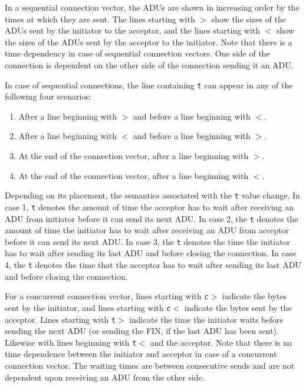 In a sequential connection vector, the ADUs are shown in increasing
order by the times at which they are sent.  The lines starting with
\texttt{$>$} show the sizes of the ADUs sent by the initiator
to the acceptor, and the lines starting with \texttt{$<$} show the
sizes of the ADUs sent by the acceptor to the initiator. Note
that there is a time dependency in case of sequential connection
vectors.  One side of the connection is dependent on the other side of
the connection sending it an ADU.

In case of sequential connections, the line containing
\texttt{t} can appear in any of the following four scenarios:
\begin{enumerate}
\item{After a line beginning with \texttt{$>$} and before a line
beginning with \texttt{$<$}}.
\item{After a line beginning with \texttt{$<$} and before a line
beginning with \texttt{$>$}}.
\item{At the end of the connection vector, after a line beginning with
\texttt{$>$}}.
\item{At the end of the connection vector, after a line beginning with
\texttt{$<$}}.
\end{enumerate}
Depending on its placement, the semantics associated with the
\texttt{t} value change. In case 1, \texttt{t} denotes the amount of
time the acceptor has to wait after receiving an ADU from initiator
before it can send its next ADU\@. In case 2, the \texttt{t} denotes
the amount of time the initiator has to wait after receiving an ADU
from acceptor before it can send its next ADU\@. In case 3, the
\texttt{t} denotes the time the initiator has to wait after sending
its last ADU and before closing the connection. In case 4, the
\texttt{t} denotes the time that the acceptor has to wait after
sending its last ADU and before closing the connection.

For a concurrent connection vector, lines starting with \texttt{c$>$}
indicate the bytes sent by the initiator, and lines starting with
\texttt{c$<$} indicate the bytes sent by the acceptor.  Lines starting
with \texttt{t$>$} indicate the time the initiator waits before
sending the next ADU (or sending the FIN, if the last ADU has been
sent).  Likewise with lines beginning with \texttt{t$<$} and the
acceptor.  Note that there is no time dependence between the initiator
and acceptor in case of a concurrent connection vector.  The waiting
times are between consecutive sends and are not dependent upon
receiving an ADU from the other side.


